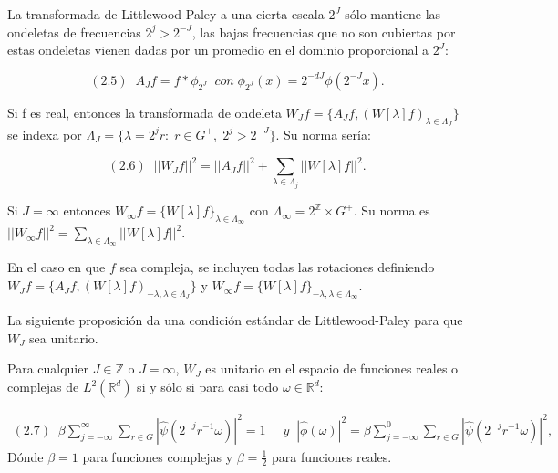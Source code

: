 \medskip
 
\noindent La transformada de Littlewood-Paley a una cierta escala $2^J$ sólo mantiene las ondeletas de frecuencias $2^j>2^{-J}$, las bajas frecuencias que no son cubiertas por estas ondeletas vienen dadas por un promedio en el dominio proporcional a $2^J$:

$$(2.5) \; \; A_Jf=f \ast \phi_ {2^J} \; \; con \; \phi_ {2^J}(x)=2^{-dJ} \phi(2^{-J}x). $$
\medskip
 
\noindent Si f es real, entonces la transformada de ondeleta $W_Jf=\lbrace A_Jf,(W[\lambda]f)_{\lambda \in \Lambda_J} \rbrace$ se indexa por $\Lambda_J=\lbrace \lambda=2^jr:\;r\in G^{+}, \; 2^j>2^{-J}\rbrace$. Su norma sería: 

$$(2.6) \; \; ||W_Jf||^2=||A_Jf||^2+\sum_{\lambda \in \Lambda_j} ||W[\lambda]f||^2.$$

\medskip
 
\noindent Si $J=\infty$ entonces $W_\infty f=\lbrace W[\lambda]f\rbrace_{\lambda \in \Lambda_\infty}$ con $\Lambda_\infty=2^\mathbb{Z} \times G^{+}$. Su norma es $||W_\infty f||^2=\sum_{\lambda \in \Lambda_\infty} ||W[\lambda]f||^2$.

\noindent En el caso en que $f$ sea compleja, se incluyen todas las rotaciones definiendo $W_Jf=\lbrace A_J f,(W[\lambda]f)_{-\lambda,\lambda \in \Lambda_J} \rbrace$ y $W_\infty f=\lbrace W[\lambda]f\rbrace_{-\lambda,\lambda \in \Lambda_\infty}$. 

\medskip

\noindent La siguiente proposición da una condición estándar de Littlewood-Paley para que $W_J$ sea unitario.

\begin{proposicion} \label{unitario}
 Para cualquier $J \in \mathbb{Z}$ o $J=\infty$, $W_J$ es unitario en el espacio de funciones reales o complejas de $L^2(\mathbb{R}^d)$ si y sólo si para casi todo $\omega \in \mathbb{R}^d$: 
 
     \begin{align*}
        (2.7) \; \; \beta \sum_{j=-\infty}^\infty \sum_{r \in G} |\widehat{\psi}(2^{-j}r^{-1}\omega)|^2=1 & \; \; y
        \;\;|\widehat{\phi}(\omega)|^2= \beta \sum_{j=-\infty}^0 \sum_{r\in G} |\widehat{\psi}(2^{-j}r^{-1}\omega)|^2,
    \end{align*}
 Dónde $\beta=1$ para funciones complejas y $\beta=\frac{1}{2}$ para funciones reales.
\end{proposicion}

